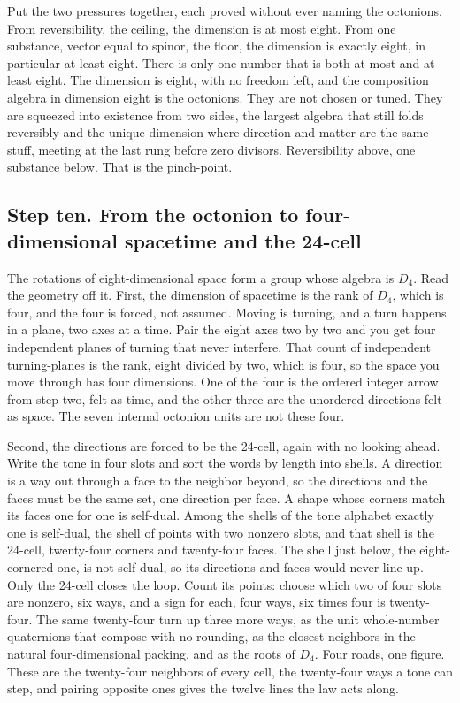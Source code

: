 Put the two pressures together, each proved without ever naming the octonions. From reversibility, the ceiling, the dimension is at most eight. From one substance, vector equal to spinor, the floor, the dimension is exactly eight, in particular at least eight. There is only one number that is both at most and at least eight. The dimension is eight, with no freedom left, and the composition algebra in dimension eight is the octonions. They are not chosen or tuned. They are squeezed into existence from two sides, the largest algebra that still folds reversibly and the unique dimension where direction and matter are the same stuff, meeting at the last rung before zero divisors. Reversibility above, one substance below. That is the pinch-point.

\subsection*{Step ten. From the octonion to four-dimensional spacetime and the 24-cell}

The rotations of eight-dimensional space form a group whose algebra is $D_4$. Read the geometry off it. First, the dimension of spacetime is the rank of $D_4$, which is four, and the four is forced, not assumed. Moving is turning, and a turn happens in a plane, two axes at a time. Pair the eight axes two by two and you get four independent planes of turning that never interfere. That count of independent turning-planes is the rank, eight divided by two, which is four, so the space you move through has four dimensions. One of the four is the ordered integer arrow from step two, felt as time, and the other three are the unordered directions felt as space. The seven internal octonion units are not these four.

Second, the directions are forced to be the 24-cell, again with no looking ahead. Write the tone in four slots and sort the words by length into shells. A direction is a way out through a face to the neighbor beyond, so the directions and the faces must be the same set, one direction per face. A shape whose corners match its faces one for one is self-dual. Among the shells of the tone alphabet exactly one is self-dual, the shell of points with two nonzero slots, and that shell is the 24-cell, twenty-four corners and twenty-four faces. The shell just below, the eight-cornered one, is not self-dual, so its directions and faces would never line up. Only the 24-cell closes the loop. Count its points: choose which two of four slots are nonzero, six ways, and a sign for each, four ways, six times four is twenty-four. The same twenty-four turn up three more ways, as the unit whole-number quaternions that compose with no rounding, as the closest neighbors in the natural four-dimensional packing, and as the roots of $D_4$. Four roads, one figure. These are the twenty-four neighbors of every cell, the twenty-four ways a tone can step, and pairing opposite ones gives the twelve lines the law acts along.

